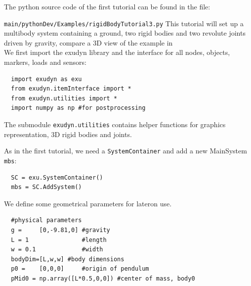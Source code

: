 \newpage
{}
The python source code of the first tutorial can be found in the file:
\bi
  \item[] \texttt{main/pythonDev/Examples/rigidBodyTutorial3.py}
\ei
This tutorial will set up a multibody system containing a ground, two rigid bodies and two revolute joints driven by gravity, compare a 3D view of the example in  
\horizontalRuler\\
\noindent We first import the exudyn library and the interface for all nodes, objects, markers, loads and sensors:
\pythonstyle\begin{lstlisting}
  import exudyn as exu
  from exudyn.itemInterface import *
  from exudyn.utilities import * 
  import numpy as np #for postprocessing
\end{lstlisting}
The submodule \texttt{exudyn.utilities} contains helper functions for graphics representation, 3D rigid bodies and joints.

\noindent As in the first tutorial, we need a \texttt{SystemContainer} and add a new MainSystem \texttt{mbs}:
\pythonstyle\begin{lstlisting}
  SC = exu.SystemContainer()
  mbs = SC.AddSystem()
\end{lstlisting}

\noindent We define some geometrical parameters for lateron use.
\pythonstyle\begin{lstlisting}
  #physical parameters
  g =     [0,-9.81,0] #gravity
  L = 1               #length
  w = 0.1             #width
  bodyDim=[L,w,w] #body dimensions
  p0 =    [0,0,0]     #origin of pendulum
  pMid0 = np.array([L*0.5,0,0]) #center of mass, body0
\end{lstlisting}


